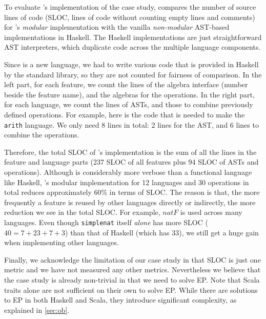 To evaluate \name's implementation of the case study,
 compares the number of source lines of code
(SLOC, lines of code without counting empty lines and comments) for
\name's \emph{modular} implementation with the vanilla
\emph{non-modular} AST-based implementations in Haskell. The Haskell
implementations are just straightforward AST interpreters, which duplicate code across the multiple language
components.

Since \name is a new language, we
had to write various code that is provided in Haskell by the standard library,
so they are not counted for fairness of comparison. In the left part, for each
feature, we count the lines of the algebra interface (number beside the feature
name), and the algebras for the operations. In the right part, for each
language, we count the lines of ASTs, and those to combine previously
defined operations. For example, here is the code that is needed to make the
\lstinline{arith} language.
We only need 8 lines in total: 2 lines for the AST, and 6 lines to combine the operations.

Therefore, the total SLOC of \name's implementation is the sum of all the
lines in the feature and language parts (237 SLOC of all features plus 94 SLOC
of ASTs and operations). Although \name is considerably more verbose than a
functional language like Haskell, \name's modular implementation for 12 languages and 30
operations in total reduces approximately 60\% in terms of SLOC. The reason is
that, the more frequently a feature is reused by other languages directly or
indirectly, the more reduction we see in the total SLOC. For example,
$\mathit{natF}$ is used across many languages. Even though \lstinline{simplenat}
itself \emph{alone} has more SLOC ($40 = 7+23+7+3$) than that of Haskell (which
has 33), we still get a huge gain when implementing other languages.

Finally, we acknowledge the limitation of our case study in that SLOC is just
one metric and we have not measured any other metrics. Nevertheless we believe
that the case study is already non-trivial in that we need to solve EP. Note
that Scala traits alone are not sufficient on their own to solve EP. While there
are solutions to EP in both Haskell and Scala, they
introduce significant complexity, as explained in \cref{sec:ob}.




